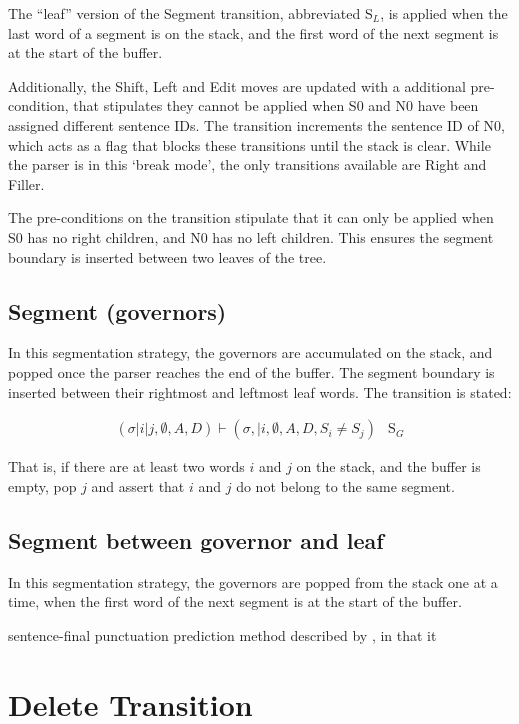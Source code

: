 \documentclass[11pt,letterpaper]{article}
\begin{document}
The ``leaf'' version of the Segment transition, abbreviated S$_L$, is applied when
the last word of a segment is on the stack, and the first word of the next segment
is at the start of the buffer.

Additionally, the Shift, Left and Edit moves are updated with a additional
pre-condition, that stipulates they cannot be applied when S0 and N0 have
been assigned different sentence IDs.  The transition increments the sentence
ID of N0, which acts as a flag that blocks these transitions until the stack is clear.
While the parser is in this `break mode', the only transitions available are
Right and Filler.

The pre-conditions on the transition stipulate that it can only be applied when
S0 has no right children, and N0 has no left children.  This ensures the segment
boundary is inserted between two leaves of the tree.

\subsection{Segment (governors)}

In this segmentation strategy, the governors are accumulated on the stack, and
popped once the parser reaches the end of the buffer.  The segment boundary is
inserted between their rightmost and leftmost leaf words.
The transition is stated:

\begin{eqnarray}
    (\sigma | i | j, \emptyset , A, D) \vdash (\sigma, | i, \emptyset, A, D, S_i \ne S_j ) & \mathrm{S}_G
\end{eqnarray}

That is, if there are at least two words $i$ and $j$ on the stack, and the buffer
is empty, pop $j$ and assert that $i$ and $j$ do not belong to the same segment.

\subsection{Segment between governor and leaf}

In this segmentation strategy, the governors are popped from the stack one at
a time, when the first word of the next segment is at the start of the buffer.

sentence-final punctuation prediction method described by \citet{zhang:13},
in that it 

\clearpage
\section{Delete Transition}
\end{document}
